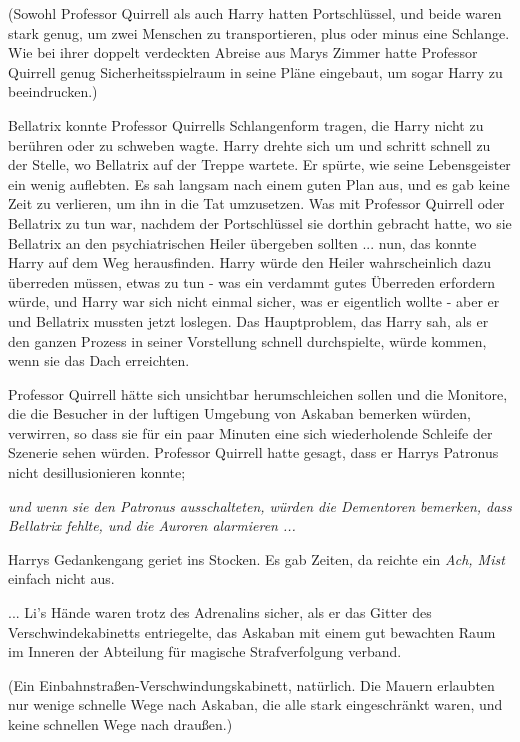 (Sowohl Professor Quirrell als auch Harry hatten Portschlüssel, und beide waren
stark genug, um zwei Menschen zu transportieren, plus oder minus eine Schlange.
Wie bei ihrer doppelt verdeckten Abreise aus Marys Zimmer hatte Professor
Quirrell genug Sicherheitsspielraum in seine Pläne eingebaut, um sogar Harry zu
beeindrucken.)

Bellatrix konnte Professor Quirrells Schlangenform tragen, die Harry nicht zu
berühren oder zu schweben wagte. Harry drehte sich um und schritt schnell zu der
Stelle, wo Bellatrix auf der Treppe wartete. Er spürte, wie seine Lebensgeister
ein wenig auflebten. Es sah langsam nach einem guten Plan aus, und es gab keine
Zeit zu verlieren, um ihn in die Tat umzusetzen. Was mit Professor Quirrell oder
Bellatrix zu tun war, nachdem der Portschlüssel sie dorthin gebracht hatte, wo
sie Bellatrix an den psychiatrischen Heiler übergeben sollten ... nun, das konnte
Harry auf dem Weg herausfinden. Harry würde den Heiler wahrscheinlich dazu
überreden müssen, etwas zu tun - was ein verdammt gutes Überreden erfordern
würde, und Harry war sich nicht einmal sicher, was er eigentlich wollte - aber
er und Bellatrix mussten jetzt loslegen. Das Hauptproblem, das Harry sah, als er
den ganzen Prozess in seiner Vorstellung schnell durchspielte, würde kommen,
wenn sie das Dach erreichten.

Professor Quirrell hätte sich unsichtbar herumschleichen sollen und die
Monitore, die die Besucher in der luftigen Umgebung von Askaban bemerken würden,
verwirren, so dass sie für ein paar Minuten eine sich wiederholende Schleife der
Szenerie sehen würden. Professor Quirrell hatte gesagt, dass er Harrys Patronus
nicht desillusionieren konnte;

\emph{und wenn sie den Patronus ausschalteten, würden die Dementoren bemerken,
dass Bellatrix fehlte, und die Auroren alarmieren ...}

Harrys Gedankengang geriet ins Stocken.
Es gab Zeiten, da reichte ein \emph{ \glqq{}Ach, Mist\grqq{}} einfach nicht
aus.

... Li's Hände waren trotz des Adrenalins sicher, als er das Gitter des
Verschwindekabinetts entriegelte, das Askaban mit einem gut bewachten Raum im
Inneren der Abteilung für magische Strafverfolgung verband.

(Ein Einbahnstraßen-Verschwindungskabinett, natürlich. Die Mauern erlaubten nur
wenige schnelle Wege nach Askaban, die alle stark eingeschränkt waren, und keine
schnellen Wege nach draußen.)

